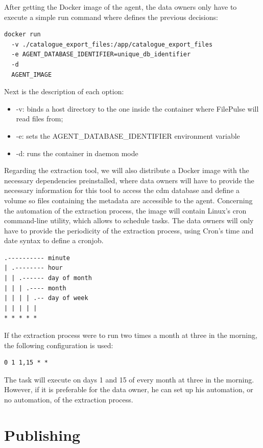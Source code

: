 After getting the Docker image of the agent, the data owners only have to execute a simple run command where defines the previous decisions:

\begin{verbatim}
docker run
  -v ./catalogue_export_files:/app/catalogue_export_files
  -e AGENT_DATABASE_IDENTIFIER=unique_db_identifier
  -d
  AGENT_IMAGE
\end{verbatim}

Next is the description of each option:
\begin{itemize}
    \item -v: binds a host directory to the one inside the container where FilePulse will read files from;
    \item -e: sets the AGENT\_DATABASE\_IDENTIFIER environment variable
    \item -d: runs the container in daemon mode
\end{itemize}

Regarding the extraction tool, we will also distribute a Docker image with the necessary dependencies preinstalled, where data owners will have to provide the necessary information for this tool to access the \gls{cdm} database and define a volume so files containing the metadata are accessible to the agent.
Concerning the automation of the extraction process, the image will contain Linux's cron command-line utility, which allows to schedule tasks.
The data owners will only have to provide the periodicity of the extraction process, using Cron's time and date syntax to define a cronjob.
\begin{verbatim}
.---------- minute
| .-------- hour
| | .------ day of month
| | | .---- month
| | | | .-- day of week
| | | | |
* * * * *
\end{verbatim}
If the extraction process were to run two times a month at three in the morning, the following configuration is used:
\begin{verbatim}
0 1 1,15 * *
\end{verbatim}
The task will execute on days 1 and 15 of every month at three in the morning.
However, if it is preferable for the data owner, he can set up his automation, or no automation, of the extraction process.

\section{Publishing}

